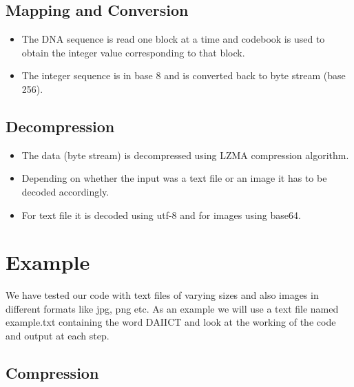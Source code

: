 \documentclass[11pt]{article}
\begin{document}
\subsection{Mapping and Conversion}

\begin{itemize}
    \item The DNA sequence is read one block at a time and codebook is used to obtain the integer value corresponding to that block.
    \item The integer sequence is in base 8 and is converted back to byte stream (base 256).
\end{itemize}

\subsection{Decompression}

\begin{itemize}
    \item The data (byte stream) is decompressed using LZMA compression algorithm.
    \item Depending on whether the input was a text file or an image it has to be decoded accordingly.
    \item For text file it is decoded using utf-8 and for images using base64.
\end{itemize}

\section{Example}

We have tested our code with text files of varying sizes and also images in different formats like jpg, png etc. As an example we will use a text file named example.txt containing the word DAIICT and look at the working of the code and output at each step.

\subsection{Compression}
\end{document}
